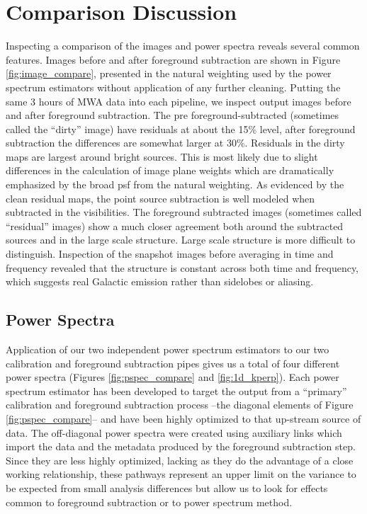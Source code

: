\documentclass[twolcolumn]{emulateapj}
\begin{document}
\section{Comparison Discussion}
\label{sec:results}

Inspecting a comparison of the images and power spectra reveals several common features. Images before and after foreground subtraction are shown in Figure \ref{fig:image_compare}, presented in the natural weighting used by the power spectrum estimators without application of any further cleaning.  Putting the same 3 hours of MWA data into each pipeline, we inspect output images before and after foreground subtraction. The pre foreground-subtracted (sometimes called the ``dirty'' image) have residuals at about the 15\% level, after foreground subtraction the differences are somewhat larger at 30\%. Residuals in the dirty maps are largest  around bright sources. This is most likely due to slight differences in the calculation of image plane weights which are dramatically emphasized by the broad psf from the natural weighting. As evidenced by the clean residual maps, the point source subtraction is well modeled when subtracted in the visibilities.  The foreground subtracted images (sometimes called ``residual'' images) show a much closer agreement both around the subtracted sources and in the large scale structure. Large scale structure is more difficult to distinguish. Inspection of the snapshot images before averaging in time and frequency revealed that the structure is constant across both time and frequency, which suggests real Galactic emission rather than sidelobes or aliasing.  



\subsection{Power Spectra}
\label{sec:power_spectrum_comparison}
Application of our two independent power spectrum estimators to our two calibration and foreground subtraction pipes gives us a total of four different power spectra (Figures \ref{fig:pspec_compare} and \ref{fig:1d_kperp}).  Each power spectrum estimator has been developed to target the output from a ``primary'' calibration and foreground subtraction process --the diagonal elements of Figure \ref{fig:pspec_compare}-- and have been highly optimized to that up-stream source of data.  The off-diagonal power spectra were created using auxiliary links which import the data and the metadata produced by the foreground subtraction step.  Since they are less highly optimized, lacking as they do the advantage of a close working relationship, these pathways represent an upper limit on the variance to be expected from small analysis differences but allow us to look for effects common to foreground subtraction or to power spectrum method.
\end{document}
